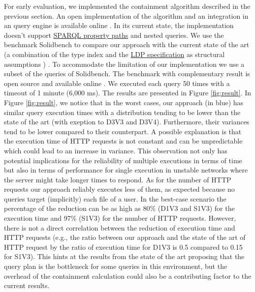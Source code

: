 For early evaluation, we implemented the containment algorithm described in the previous section.
An open implementation of the algorithm and an integration in an query engine  is available online .
In its current state, the implementation doesn't support 
\href{https://www.w3.org/TR/sparql11-query/#propertypaths}{SPARQL property paths} and nested queries.
We use the benchmark Solidbench \cite{Taelman2023} to compare our approach with the current state of the art 
(a combination of the type index and the \href{https://www.w3.org/TR/ldp/}{LDP specification} as structural assumptions ) \cite{Taelman2023}.
To accommodate the limitation of our implementation we use a subset of the queries of Solidbench.
The benchmark with complementary result is open source and available online .
We executed each query 50 times with a timeout of 1 minute (6,000 ms).
The results are presented in Figure \ref{fig:result}.
In Figure \ref{fig:result},   we notice that in the worst cases, our approach (in blue) has similar query execution times with a 
distribution tending to be lower than the state of the art (with exeption to D3V3 and D3V4).
Furthermore, their variances tend to be lower compared to their counterpart. 
A possible explanation is that the execution time of HTTP requests is not constant and can be unpredictable \cite{hartig2016walking}
which could lead to an increase in variance.
This observation not only has potential implications for the reliability of multiple executions in terms of time
but also in terms of performance for single execution in unstable networks where the server might take longer times to respond. 
As for the number of HTTP requests our approach reliably executes less of them, as expected because no
queries target (implicitly) each file of a user.
In the best-case scenario the percentage of the reduction can be as high as 80\% (D1V3 and S1V3) for the execution time 
and 97\% (S1V3) for the number of HTTP requests.
However, there is not a direct correlation between the reduction of execution time and HTTP requests (e.g., the ratio 
between our approach and the state of the art of HTTP request by the ratio of execution time for D1V3 is 0.5 compared to 0.15 for S1V3).
This hints at the results from the state of the art \cite{Taelman2023} proposing that the query plan is the bottleneck for some queries in this environment,
but the overhead of the containment calculation could also be a contributing factor to the current results.

  
